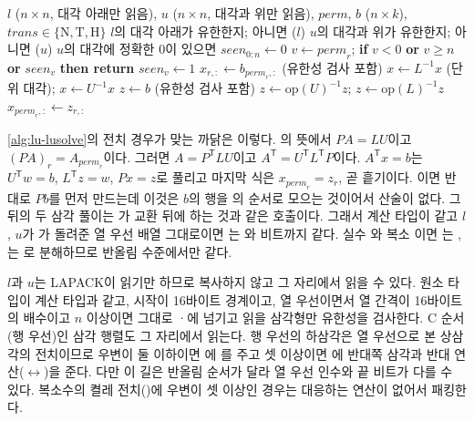 \begin{algorithm}[htbp]
\begin{algorithmic}[1]
\Require $l$ ($n\times n$, 대각 아래만 읽음), $u$ ($n\times n$, 대각과 위만 읽음), $\mathit{perm}$, $b$ ($n\times k$), $\mathit{trans}\in\{\mathrm N,\mathrm T,\mathrm H\}$
\State $l$의 대각 아래가 유한한지; 아니면 \Return {}($l$)
\State $u$의 대각과 위가 유한한지; 아니면 \Return {}($u$)
\State $u$의 대각에 정확한 $0$이 있으면 \Return {}
\State $\mathit{seen}_{0:n}\gets0$
 
  \State $v\gets\mathit{perm}_r$; \textbf{if} $v<0$ \textbf{or} $v\ge n$ \textbf{or} $\mathit{seen}_v$ \textbf{then return} 
  \State $\mathit{seen}_v\gets1$
\EndFor
{}
  \State $x_{r,:}\gets b_{\mathit{perm}_r,:}$ (유한성 검사 포함) 
  \State $x\gets L^{-1}x$ (단위 대각); $x\gets U^{-1}x$
\Else
  \State $z\gets b$ (유한성 검사 포함)
  \State $z\gets\mathrm{op}(U)^{-1}z$; $z\gets\mathrm{op}(L)^{-1}z$ 
  \State $x_{\mathit{perm}_r,:}\gets z_{r,:}$ 
\EndIf
\end{algorithmic}
\caption{의 배치 원소 하나}
\label{alg:lu-lusolve}
\end{algorithm}

\cref{alg:lu-lusolve}의 전치 경우가 맞는 까닭은 이렇다. 의 뜻에서 $PA=LU$이고 $(PA)_r=A_{\mathit{perm}_r}$이다. 그러면 $A=P^{\mathsf T}LU$이고 $A^{\mathsf T}=U^{\mathsf T}L^{\mathsf T}P$이다. $A^{\mathsf T}x=b$는 $U^{\mathsf T}w=b$, $L^{\mathsf T}z=w$, $Px=z$로 풀리고 마지막 식은 $x_{\mathit{perm}_r}=z_r$, 곧 흩기이다. 이면 반대로 $Pb$를 먼저 만드는데 이것은 $b$의 행을 의 순서로 모으는 것이어서 산술이 없다. 그 뒤의 두 삼각 풀이는 가 교환 뒤에 하는 것과 같은 호출이다. 그래서 계산 타입이 같고 $l$, $u$가 가 돌려준 열 우선 배열 그대로이면 는 와 비트까지 같다. 실수 와 복소 이면 는 , 는 로 분해하므로 반올림 수준에서만 같다.

$l$과 $u$는 LAPACK이 읽기만 하므로 복사하지 않고 그 자리에서 읽을 수 있다. 원소 타입이 계산 타입과 같고, 시작이 16바이트 경계이고, 열 우선이면서 열 간격이 16바이트의 배수이고 $n$ 이상이면 그대로 ·에 넘기고 읽을 삼각형만 유한성을 검사한다. C 순서(행 우선)인 삼각 행렬도 그 자리에서 읽는다. 행 우선의 하삼각은 열 우선으로 본 상삼각의 전치이므로 우변이 둘 이하이면 에 를 주고 셋 이상이면 에 반대쪽 삼각과 반대 연산($\leftrightarrow$)을 준다. 다만 이 길은 반올림 순서가 달라 열 우선 인수와 끝 비트가 다를 수 있다. 복소수의 켤레 전치()에 우변이 셋 이상인 경우는 대응하는 연산이 없어서 패킹한다.

